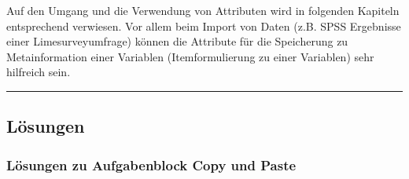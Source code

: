 \documentclass[]{article}
\begin{document}
Auf den Umgang und die Verwendung von Attributen wird in folgenden
Kapiteln entsprechend verwiesen. Vor allem beim Import von Daten (z.B.
SPSS Ergebnisse einer Limesurveyumfrage) können die Attribute für die
Speicherung zu Metainformation einer Variablen (Itemformulierung zu
einer Variablen) sehr hilfreich sein.

\begin{center}\rule{0.5\linewidth}{\linethickness}\end{center}

\subsection*{Lösungen}\label{losungen-1}

\subsubsection*{Lösungen zu Aufgabenblock Copy und
Paste}\label{losungen-zu-aufgabenblock-copy-und-paste}
\end{document}
